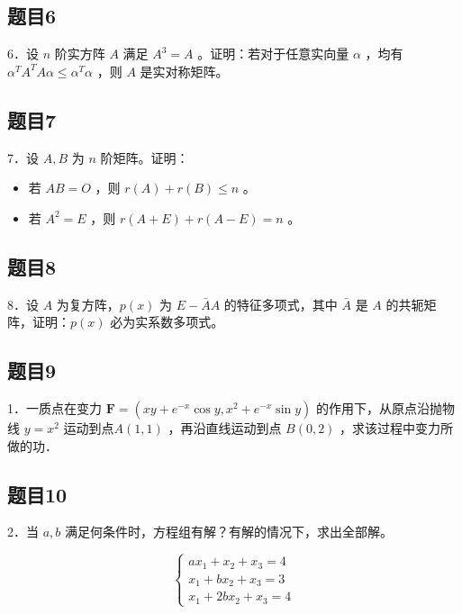 \documentclass{article}
\begin{document}
\subsection{题目6}
6．设 \(n\) 阶实方阵 \(A\) 满足 \(A^{3}=A\) 。证明：若对于任意实向量 \(\alpha\) ，均有 \(\alpha^{T} A^{T} A \alpha \leq \alpha^{T} \alpha\) ，则 \(A\) 是实对称矩阵。

\subsection{题目7}
7．设 \(A, B\) 为 \(n\) 阶矩阵。证明：

\begin{itemize}
  \item[（1）] 若 \(A B=O\) ，则 \(r(A)+r(B) \leq n\) 。
  \item[（2）] 若 \(A^{2}=E\) ，则 \(r(A+E)+r(A-E)=n\) 。
\end{itemize}

\subsection{题目8}
8．设 \(A\) 为复方阵，\(p(x)\) 为 \(E-\bar{A} A\) 的特征多项式，其中 \(\bar{A}\) 是 \(A\) 的共轭矩阵，证明：\(p(x)\) 必为实系数多项式。

\subsection{题目9}
1．一质点在变力 \(\mathbf{F}=\left(x y+e^{-x} \cos y, x^{2}+e^{-x} \sin y\right)\) 的作用下，从原点沿抛物线 \(y=x^{2}\) 运动到点\(A(1,1)\) ，再沿直线运动到点 \(B(0,2)\) ，求该过程中变力所做的功．

\subsection{题目10}
2．当 \(a, b\) 满足何条件时，方程组有解？有解的情况下，求出全部解。

\[
\left\{\begin{array}{l}
a x_{1}+x_{2}+x_{3}=4 \\
x_{1}+b x_{2}+x_{3}=3 \\
x_{1}+2 b x_{2}+x_{3}=4
\end{array}\right.
\]
\end{document}
